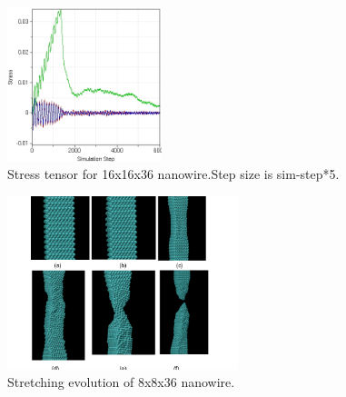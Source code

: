 \documentclass[11pt]{report}
\begin{document}
        \begin{figure}
            \label{fig:rawdata-large}
            \centering
            \includegraphics[width=0.4\textwidth]{StressvsSimulationStep-large.jpg}
            \caption{Stress tensor for 16x16x36 nanowire.Step size is sim-step*5.}
        \end{figure}
        \begin{figure}
            \label{fig:evolution}
            \centering
            \includegraphics[width=0.6\textwidth]{evolution.png}
            \caption{Stretching evolution of 8x8x36 nanowire.}
        \end{figure}
\end{document}
